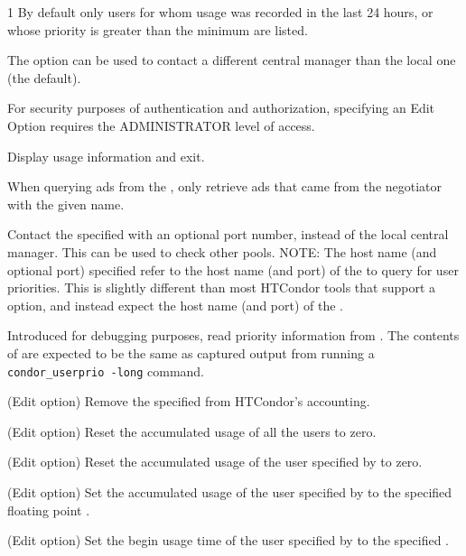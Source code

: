 \begin{ManPage}{\label{man-condor-userprio}}{1}
By default only users for whom usage was recorded in the last 24 hours, 
or whose priority is greater than the minimum are listed.

The  option can be used to contact a different central manager 
than the local one (the default).


For security purposes of authentication and authorization,
specifying an Edit Option requires the ADMINISTRATOR level of access.

\begin{Options}

  {Display usage information and exit.}

  {When querying ads from the , only retrieve ads
  that came from the negotiator with the given name.}

  {Contact the specified  with an
  optional port number, instead of the local central manager. 
  This can be used to check other pools.  
  NOTE: The host name (and optional port) specified refer to the host name
  (and port) of the  to query for user priorities.
  This is slightly different than most HTCondor tools
  that support a  option,
  and instead expect the host name (and port) of the .}

  {Introduced for debugging purposes,
   read priority information from .
   The contents of  are expected to be the same as captured
   output from running a \texttt{condor\_userprio -long} command.}

  {(Edit option) Remove the specified  from HTCondor's accounting.}

  {(Edit option) Reset the accumulated usage of all the users to zero.}

  {(Edit option) Reset the accumulated usage of the user specified by
   to zero. }

  {(Edit option) Set the accumulated usage of the user specified by
   to the specified floating point . }

  {(Edit option) Set the begin usage time of the user specified by
   to the specified . }


\end{Options}
\end{ManPage}
